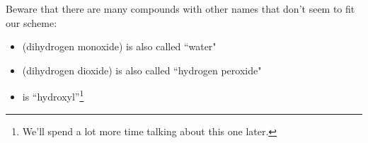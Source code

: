 \documentclass[11pt, oneside]{article}   	%
\begin{document}
Beware that there are many compounds with other names that don't seem to fit our scheme:
\begin{itemize}
\item {} (dihydrogen monoxide) is also called ``water"
\item {} (dihydrogen dioxide) is also called ``hydrogen peroxide"
\item {} is ``hydroxyl''\footnote{We'll spend a lot more time talking about this one later.}
\end{itemize}

\nocite{wile-chem-2}
{}

\end{document}
